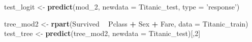 \documentclass[]{article}
\newenvironment{Shaded}{\begin{snugshade}}{\end{snugshade}}
\newcommand{\KeywordTok}[1]{\textcolor[rgb]{0.13,0.29,0.53}{\textbf{#1}}}
\newcommand{\DataTypeTok}[1]{\textcolor[rgb]{0.13,0.29,0.53}{#1}}
\newcommand{\DecValTok}[1]{\textcolor[rgb]{0.00,0.00,0.81}{#1}}
\newcommand{\StringTok}[1]{\textcolor[rgb]{0.31,0.60,0.02}{#1}}
\newcommand{\OperatorTok}[1]{\textcolor[rgb]{0.81,0.36,0.00}{\textbf{#1}}}
\newcommand{\NormalTok}[1]{#1}
\begin{document}
\begin{Shaded}
\begin{Highlighting}[]
\NormalTok{test_logit <-}\StringTok{ }\KeywordTok{predict}\NormalTok{(mod_}\DecValTok{2}\NormalTok{, }\DataTypeTok{newdata =}\NormalTok{ Titanic_test, }\DataTypeTok{type =} \StringTok{'response'}\NormalTok{)}

\NormalTok{tree_mod2 <-}\StringTok{ }\KeywordTok{rpart}\NormalTok{(Survived }\OperatorTok{~}\StringTok{ }\NormalTok{Pclass }\OperatorTok{+}\StringTok{ }\NormalTok{Sex }\OperatorTok{+}\StringTok{ }\NormalTok{Fare, }\DataTypeTok{data =}\NormalTok{ Titanic_train)}
\NormalTok{test_tree <-}\StringTok{ }\KeywordTok{predict}\NormalTok{(tree_mod2, }\DataTypeTok{newdata =}\NormalTok{ Titanic_test)[,}\DecValTok{2}\NormalTok{]}
\end{Highlighting}
\end{Shaded}
\end{document}
